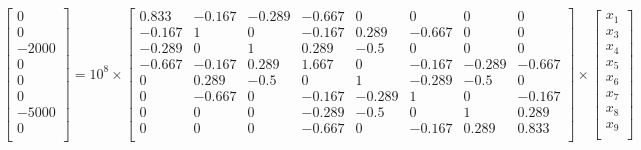 \documentclass[8pt]{article}
\begin{document}
\[
\begin{bmatrix}
    0 \\
    0 \\
    -2000 \\
    0 \\
    0 \\
    0 \\
    -5000 \\
    0 \\
\end{bmatrix}
=
10^8 \times
\begin{bmatrix}
    0.833 & -0.167 & -0.289 & -0.667 & 0 & 0 & 0 & 0 \\
    -0.167 & 1 & 0 & -0.167 & 0.289 & -0.667 & 0 & 0 \\
    -0.289 & 0 & 1 & 0.289 & -0.5 & 0 & 0 & 0 \\
    -0.667 & -0.167 & 0.289 & 1.667 & 0 & -0.167 & -0.289 & -0.667 \\
    0 & 0.289 & -0.5 & 0 & 1 & -0.289 & -0.5 & 0 \\
    0 & -0.667 & 0 & -0.167 & -0.289 & 1 & 0 & -0.167 \\
    0 & 0 & 0 & -0.289 & -0.5 & 0 & 1 & 0.289 \\
    0 & 0 & 0 & -0.667 & 0 & -0.167 & 0.289 & 0.833 \\
\end{bmatrix}
\times
\begin{bmatrix}
    x_1 \\
    x_3 \\
    x_4 \\
    x_5 \\
    x_6 \\
    x_7 \\
    x_8 \\
    x_9 \\
\end{bmatrix}
\]
\end{document}
